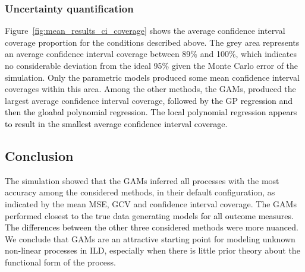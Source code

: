 \documentclass[man, floatsintext]{apa7}
\begin{document}
\subsubsection{Uncertainty quantification}

Figure~\ref{fig:mean_results_ci_coverage} shows the average confidence interval
coverage proportion for the conditions described above. The grey area
represents an average confidence interval coverage between 89\% and 100\%,
which indicates no considerable deviation from the ideal 95\% given the Monte
Carlo error of the simulation. Only the parametric models produced some mean
confidence interval coverages within this area. Among the other methods, the
GAMs, produced the largest average confidence interval coverage,
\textcolor{black}{followed by the GP regression and then the gloabal polynomial
  regression. The local polynomial regression appears to result in the smallest
  average confidence interval coverage.}

\begin{sidewaysfigure*}[htbp]
  \caption{Average confidence interval coverage across all processes, analysis
    methods, and simulation conditions}
  \label{fig:mean_results_ci_coverage}
\end{sidewaysfigure*}

\subsection{Conclusion}

The simulation showed that the GAMs inferred all processes with the most
accuracy among the considered methods, in their default configuration, as
indicated by the mean MSE, GCV and confidence interval coverage. The GAMs
performed closest to the true data generating models \textcolor{black}{for all
  outcome measures. The differences between the other three considered methods
  were more nuanced.} We conclude that GAMs are an attractive starting point
for
modeling unknown non-linear processes in ILD, especially when there is little
prior theory about the functional form of the process.
\end{document}
